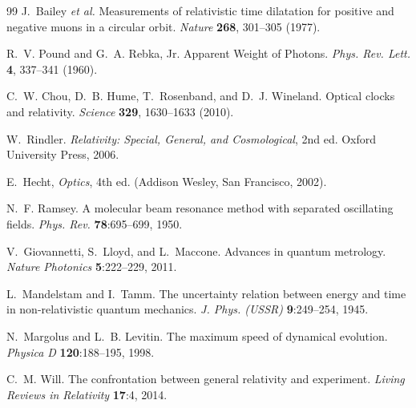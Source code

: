 \documentclass[12pt]{article}
\begin{document}
\begin{thebibliography}{99}
J.~Bailey \emph{et al.}
\newblock Measurements of relativistic time dilatation for positive and negative muons in a circular orbit.
\newblock \emph{Nature} \textbf{268}, 301--305 (1977).

R.~V. Pound and G.~A. Rebka, Jr.
\newblock Apparent Weight of Photons.
\newblock \emph{Phys. Rev. Lett.} \textbf{4}, 337--341 (1960).

C.~W. Chou, D.~B. Hume, T.~Rosenband, and D.~J. Wineland.
\newblock Optical clocks and relativity.
\newblock \emph{Science} \textbf{329}, 1630--1633 (2010).

W.~Rindler.
\newblock \emph{Relativity: Special, General, and Cosmological}, 2nd ed.
\newblock Oxford University Press, 2006.

E.~Hecht, \emph{Optics}, 4th ed. (Addison Wesley, San Francisco, 2002).


N.~F. Ramsey.
\newblock A molecular beam resonance method with separated oscillating fields.
\newblock \emph{Phys. Rev.} \textbf{78}:695--699, 1950.

V.~Giovannetti, S.~Lloyd, and L.~Maccone.
\newblock Advances in quantum metrology.
\newblock \emph{Nature Photonics} \textbf{5}:222--229, 2011.

L.~Mandelstam and I.~Tamm.
\newblock The uncertainty relation between energy and time in non-relativistic quantum mechanics.
\newblock \emph{J. Phys. (USSR)} \textbf{9}:249--254, 1945.

N.~Margolus and L.~B. Levitin.
\newblock The maximum speed of dynamical evolution.
\newblock \emph{Physica D} \textbf{120}:188--195, 1998.

C.~M. Will.
\newblock The confrontation between general relativity and experiment.
\newblock \emph{Living Reviews in Relativity} \textbf{17}:4, 2014.

\end{thebibliography}
\end{document}
